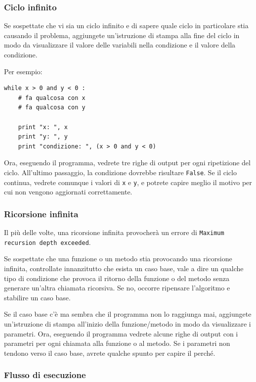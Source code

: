 \documentclass[10pt]{book}
\begin{document}
\subsubsection{Ciclo infinito}

Se sospettate che vi sia un ciclo infinito e di sapere quale ciclo in particolare stia causando il problema, aggiungete un'istruzione di stampa alla fine del ciclo in modo da visualizzare il valore delle variabili nella condizione e il valore della condizione.

Per esempio:

\begin{verbatim}
while x > 0 and y < 0 :
    # fa qualcosa con x
    # fa qualcosa con y

    print "x: ", x
    print "y: ", y
    print "condizione: ", (x > 0 and y < 0)
\end{verbatim}
%
Ora, eseguendo il programma, vedrete tre righe di output per ogni ripetizione del ciclo. All'ultimo passaggio, la condizione dovrebbe risultare {\tt False}.  Se il ciclo continua, vedrete comunque i valori di {\tt x} e {\tt y}, e potrete capire meglio il motivo per cui non vengono aggiornati correttamente.


\subsubsection{Ricorsione infinita}

Il più delle volte, una ricorsione infinita provocherà un errore di {\tt Maximum recursion depth exceeded}.

Se sospettate che una funzione o un metodo stia provocando una ricorsione infinita, controllate innanzitutto che esista un caso base, vale a dire un qualche tipo di condizione che provoca il ritorno della funzione o del metodo senza generare un'altra chiamata ricorsiva. Se no, occorre ripensare l'algoritmo e stabilire un caso base.

Se il caso base c'è ma sembra che il programma non lo raggiunga mai, aggiungete un'istruzione di stampa all'inizio della funzione/metodo in modo da visualizzare i parametri. Ora, eseguendo il programma vedrete alcune righe di output con i parametri per ogni chiamata alla funzione o al metodo. Se i parametri non tendono verso il caso base, avrete qualche spunto per capire il perché.


\subsubsection{Flusso di esecuzione}
\end{document}

